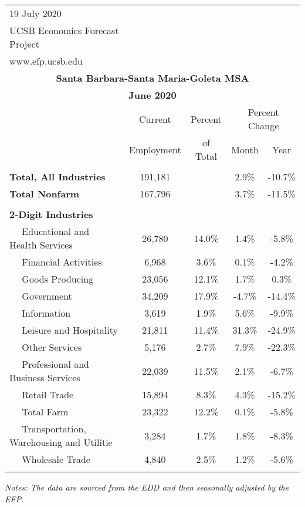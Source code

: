 \documentclass[12pt]{article}
\begin{document}
\begin{landscape}
\begin{table}
\begin{tabular}{|l|c|c|c|c|}
\multicolumn{1}{l}{\small 19 July 2020} & \multicolumn{4}{c}{} \\
\multicolumn{1}{l}{\small UCSB Economics Forecast Project} & \multicolumn{4}{c}{} \\
\multicolumn{1}{l}{\small www.efp.ucsb.edu} & \multicolumn{4}{c}{} \\
\multicolumn{5}{c}{\large \textbf{Santa Barbara-Santa Maria-Goleta MSA}} \\
\multicolumn{5}{c}{\large \textbf{June 2020}} \
\multicolumn{5}{l}{\small Data Seasonally Adjusted} \\ \hline \hline
& Current & Percent & \multicolumn{2}{c}{Percent Change} \vline \\
& Employment & of Total & Month & Year \\ \hline
&&&& \\
\textbf{Total, All Industries} & 191,181 && 2.9\% & -10.7\% \\
\textbf{Total Nonfarm} & 167,796 && 3.7\% & -11.5\% \\
&&&& \\
\textbf{2-Digit Industries} &&&& \\
$\quad$ Educational and Health Services & 26,780 & 14.0\% & 1.4\% & -5.8\% \\
$\quad$ Financial Activities & 6,968 & 3.6\% & 0.1\% & -4.2\% \\
$\quad$ Goods Producing & 23,056 & 12.1\% & 1.7\% & 0.3\% \\
$\quad$ Government & 34,209 & 17.9\% & -4.7\% & -14.4\% \\
$\quad$ Information & 3,619 & 1.9\% & 5.6\% & -9.9\% \\
$\quad$ Leisure and Hospitality & 21,811 & 11.4\% & 31.3\% & -24.9\% \\
$\quad$ Other Services & 5,176 & 2.7\% & 7.9\% & -22.3\% \\
$\quad$ Professional and Business Services & 22,039 & 11.5\% & 2.1\% & -6.7\% \\
$\quad$ Retail Trade & 15,894 & 8.3\% & 4.3\% & -15.2\% \\
$\quad$ Total Farm & 23,322 & 12.2\% & 0.1\% & -5.8\% \\
$\quad$ Transportation, Warehousing and Utilitie & 3,284 & 1.7\% & 1.8\% & -8.3\% \\
$\quad$ Wholesale Trade & 4,840 & 2.5\% & 1.2\% & -5.6\% \\
&&&& \\ \hline \hline
\end{tabular}
\par
\vspace{.5em}
\footnotesize
\textit{Notes: The data are sourced from the EDD and then seasonally adjusted by the EFP.}
\end{table}
\end{landscape}
\end{document}
